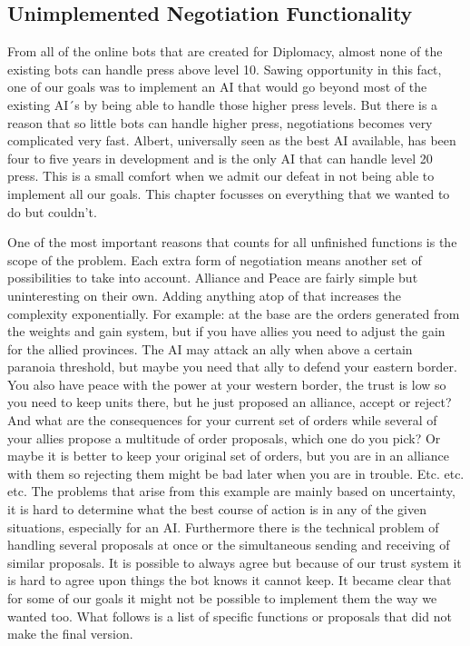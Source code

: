 \documentclass[a4paper]{article} %
\begin{document}
\subsection{Unimplemented Negotiation Functionality}

From all of the online bots that are created for Diplomacy, almost none of the existing bots can handle press above level 10. Sawing opportunity in this fact, one of our goals was to implement an AI that would go beyond most of the existing AI´s by being able to handle those higher press levels. But there is a reason that so little bots can handle higher press, negotiations becomes very complicated very fast. Albert, universally seen as the best AI available, has been four to five years in development and is the only AI that can handle level 20 press. This is a small comfort when we admit our defeat in not being able to implement all our goals. This chapter focusses on everything that we wanted to do but couldn't.

One of the most important reasons that counts for all unfinished functions is the scope of the problem. Each extra form of negotiation means another set of possibilities to take into account. Alliance and Peace are fairly simple but uninteresting on their own. Adding anything atop of that increases the complexity exponentially. For example: at the base are the orders generated from the weights and gain system, but if you have allies you need to adjust the gain for the allied provinces. The AI may attack an ally when above a certain paranoia threshold, but maybe you need that ally to defend your eastern border. You also have peace with the power at your western border, the trust is low so you need to keep units there, but he just proposed an alliance, accept or reject? And what are the consequences for your current set of orders while several of your allies propose a multitude of order proposals, which one do you pick? Or maybe it is better to keep your original set of orders, but you are in an alliance with them so rejecting them might be bad later when you are in trouble. Etc. etc. etc. The problems that arise from this example are mainly based on uncertainty, it is hard to determine what the best course of action is in any of the given situations, especially for an AI. Furthermore there is the technical problem of handling several proposals at once or the simultaneous  sending and receiving of similar proposals. It is possible to always agree but because of our trust system it is hard to agree upon things the bot knows it cannot keep. It became clear that for some of our goals it might not be possible to implement them the way we wanted too. What follows is a list of specific functions or proposals that did not make the final version.
\end{document}
